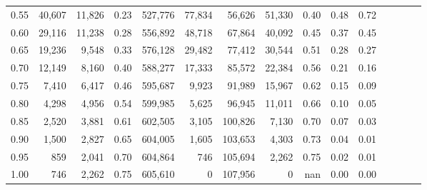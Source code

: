 \begin{tabular}{rrrcrrrrrrrrrrr}
0.55 &  40,607 &  11,826 &                                       0.23 &  527,776 &   77,834 &   56,626 &   51,330 &  0.40 &  0.48 &                         0.72 \\
0.60 &  29,116 &  11,238 &                                       0.28 &  556,892 &   48,718 &   67,864 &   40,092 &  0.45 &  0.37 &                         0.45 \\
0.65 &  19,236 &   9,548 &                                       0.33 &  576,128 &   29,482 &   77,412 &   30,544 &  0.51 &  0.28 &                         0.27 \\
0.70 &  12,149 &   8,160 &                                       0.40 &  588,277 &   17,333 &   85,572 &   22,384 &  0.56 &  0.21 &                         0.16 \\
0.75 &   7,410 &   6,417 &                                       0.46 &  595,687 &    9,923 &   91,989 &   15,967 &  0.62 &  0.15 &                         0.09 \\
0.80 &   4,298 &   4,956 &                                       0.54 &  599,985 &    5,625 &   96,945 &   11,011 &  0.66 &  0.10 &                         0.05 \\
0.85 &   2,520 &   3,881 &                                       0.61 &  602,505 &    3,105 &  100,826 &    7,130 &  0.70 &  0.07 &                         0.03 \\
0.90 &   1,500 &   2,827 &                                       0.65 &  604,005 &    1,605 &  103,653 &    4,303 &  0.73 &  0.04 &                         0.01 \\
0.95 &     859 &   2,041 &                                       0.70 &  604,864 &      746 &  105,694 &    2,262 &  0.75 &  0.02 &                         0.01 \\
1.00 &     746 &   2,262 &                                       0.75 &  605,610 &        0 &  107,956 &        0 &   nan &  0.00 &                         0.00 \\
\bottomrule
\end{tabular}
